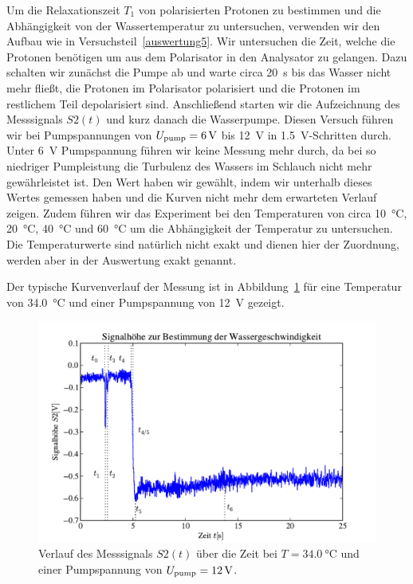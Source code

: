 \documentclass[paper=a4,
	fontsize=10pt,
	DIV=18,
	twocolumn,
	parskip=half
	]{scrartcl}
\numberwithin{equation}{section}    %
\begin{document}
Um die Relaxationszeit $T_1$ von polarisierten Protonen zu bestimmen und die Abhängigkeit von der Wassertemperatur zu untersuchen, verwenden wir den Aufbau wie in Versuchsteil~\ref{auswertung5}. Wir untersuchen die Zeit, welche die Protonen benötigen um aus dem Polarisator in den Analysator zu gelangen. Dazu schalten wir zunächst die Pumpe ab und warte circa \SI{20}{\second} bis das Wasser nicht mehr fließt, die Protonen im Polarisator polarisiert und die Protonen im restlichem Teil depolarisiert sind. Anschließend starten wir die Aufzeichnung des Messsignals $S2(t)$ und kurz danach die Wasserpumpe. Diesen Versuch führen wir bei Pumpspannungen von $U_{\rm pump}=\SI{6}{\volt}$ bis \SI{12}{\volt} in \SI{1.5}{\volt}-Schritten durch. Unter \SI{6}{\volt} Pumpspannung führen wir keine Messung mehr durch, da bei so niedriger Pumpleistung die Turbulenz des Wassers im Schlauch nicht mehr gewährleistet ist. Den Wert haben wir gewählt, indem wir unterhalb dieses Wertes gemessen haben und die Kurven nicht mehr dem erwarteten Verlauf zeigen. Zudem führen wir das Experiment bei den Temperaturen von circa \SI{10}{\celsius}, \SI{20}{\celsius}, \SI{40}{\celsius} und \SI{60}{\celsius} um die Abhängigkeit der Temperatur zu untersuchen. Die Temperaturwerte sind natürlich nicht exakt und dienen hier der Zuordnung, werden aber in der Auswertung exakt genannt.

Der typische Kurvenverlauf der Messung ist in Abbildung~\ref{fig.wassergeschwindigkeit} für eine Temperatur von \SI{34.0}{\celsius} und einer Pumpspannung von \SI{12}{\volt} gezeigt.

\begin{figure}[htp]
	\begin{center}
		\includegraphics[width=\columnwidth]{Data-Plots/06-wassergeschwindigkeit.pdf}
		\caption{Verlauf des Messsignals $S2(t)$ über die Zeit bei $T=\SI{34.0}{\celsius}$ und einer Pumpspannung von $U_{\rm pump}=\SI{12}{\volt}$.}
		\label{fig.wassergeschwindigkeit}
	\end{center}
\end{figure}
\end{document}
